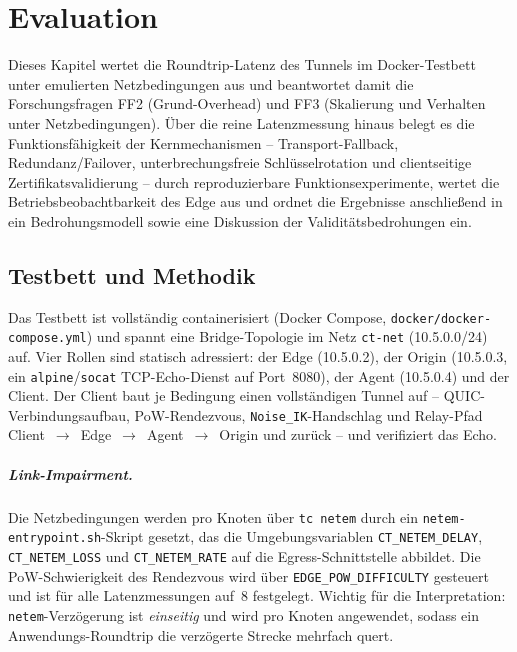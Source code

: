 \chapter{Evaluation}
\label{ch:evaluation}

Dieses Kapitel wertet die Roundtrip-Latenz des Tunnels im Docker-Testbett unter
emulierten Netzbedingungen aus und beantwortet damit die Forschungsfragen FF2
(Grund-Overhead) und FF3 (Skalierung und Verhalten unter Netzbedingungen).
Über die reine Latenzmessung hinaus belegt es die Funktionsfähigkeit der
Kernmechanismen -- Transport-Fallback, Redundanz/Failover, unterbrechungsfreie
Schlüsselrotation und clientseitige Zertifikatsvalidierung -- durch reproduzierbare
Funktionsexperimente, wertet die Betriebsbeobachtbarkeit des Edge aus und ordnet
die Ergebnisse anschließend in ein Bedrohungsmodell sowie eine Diskussion der
Validitätsbedrohungen ein.

\section{Testbett und Methodik}
\label{sec:testbett}

Das Testbett ist vollständig containerisiert (Docker Compose,
\texttt{docker/docker-compose.yml}) und spannt eine Bridge-Topologie im
Netz \texttt{ct-net} (10.5.0.0/24) auf. Vier Rollen sind statisch adressiert:
der Edge (10.5.0.2), der Origin (10.5.0.3, ein \texttt{alpine}/\texttt{socat}
TCP-Echo-Dienst auf Port~8080), der Agent (10.5.0.4) und der Client. Der Client
baut je Bedingung einen vollständigen Tunnel auf -- QUIC-Verbindungsaufbau,
PoW-Rendezvous, \texttt{Noise\_IK}-Handschlag und Relay-Pfad
Client~$\rightarrow$~Edge~$\rightarrow$~Agent~$\rightarrow$~Origin und zurück --
und verifiziert das Echo.

\paragraph{Link-Impairment.} Die Netzbedingungen werden pro Knoten über
\texttt{tc netem} durch ein \texttt{netem-entrypoint.sh}-Skript gesetzt, das die
Umgebungsvariablen \texttt{CT\_NETEM\_DELAY}, \texttt{CT\_NETEM\_LOSS} und
\texttt{CT\_NETEM\_RATE} auf die Egress-Schnittstelle abbildet. Die
PoW-Schwierigkeit des Rendezvous wird über \texttt{EDGE\_POW\_DIFFICULTY}
gesteuert und ist für alle Latenzmessungen auf~8 festgelegt. Wichtig für die
Interpretation: \texttt{netem}-Verzögerung ist \emph{einseitig} und wird pro
Knoten angewendet, sodass ein Anwendungs-Roundtrip die verzögerte Strecke
mehrfach quert.

